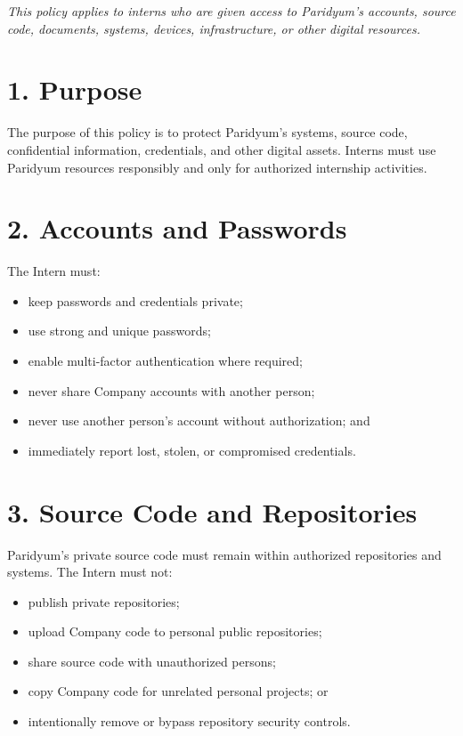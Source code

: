 \documentclass{paridyum}
\begin{document}
\paridyumletterhead
\paridyumdateref{\dkDocDate}{\dkDocRef}

\textit{This policy applies to interns who are given access to Paridyum's accounts,
source code, documents, systems, devices, infrastructure, or other digital resources.}

\section*{1. Purpose}
The purpose of this policy is to protect Paridyum's systems, source code, confidential
information, credentials, and other digital assets. Interns must use Paridyum resources
responsibly and only for authorized internship activities.

\section*{2. Accounts and Passwords}
The Intern must:
\begin{itemize}[leftmargin=*, noitemsep]
    \item keep passwords and credentials private;
    \item use strong and unique passwords;
    \item enable multi-factor authentication where required;
    \item never share Company accounts with another person;
    \item never use another person's account without authorization; and
    \item immediately report lost, stolen, or compromised credentials.
\end{itemize}

\section*{3. Source Code and Repositories}
Paridyum's private source code must remain within authorized repositories and systems.
The Intern must not:
\begin{itemize}[leftmargin=*, noitemsep]
    \item publish private repositories;
    \item upload Company code to personal public repositories;
    \item share source code with unauthorized persons;
    \item copy Company code for unrelated personal projects; or
    \item intentionally remove or bypass repository security controls.
\end{itemize}
\end{document}
